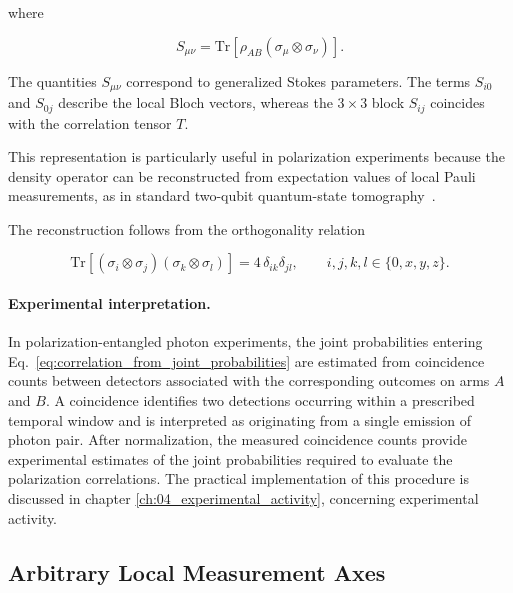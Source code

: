 where

\begin{equation}
S_{\mu\nu}
=
\mathrm{Tr}
\left[
\rho_{AB}
\left(
\sigma_\mu\otimes\sigma_\nu
\right)
\right].
\label{eq:generalized_stokes_parameters}
\end{equation}

The quantities \(S_{\mu\nu}\) correspond to generalized Stokes parameters.
The terms \(S_{i0}\) and \(S_{0j}\) describe the local Bloch vectors, whereas
the \(3\times3\) block \(S_{ij}\) coincides with the correlation tensor \(T\).

This representation is particularly useful in polarization experiments because
the density operator can be reconstructed from expectation values of local Pauli
measurements, as in standard two-qubit quantum-state tomography~\cite{altepeter_james_kwiat_quantum_state_tomography}.

The reconstruction follows from the orthogonality relation

\begin{equation}
\mathrm{Tr}
\left[
(\sigma_i\otimes\sigma_j)
(\sigma_k\otimes\sigma_l)
\right]
=
4\,\delta_{ik}\delta_{jl},
\qquad
i,j,k,l\in\{0,x,y,z\}.
\label{eq:pauli_tensor_orthogonality}
\end{equation}

\medskip 

\paragraph{Experimental interpretation.}
In polarization-entangled photon experiments, the joint probabilities entering
Eq.~\eqref{eq:correlation_from_joint_probabilities} are estimated from coincidence
counts between detectors associated with the corresponding outcomes on arms \(A\)
and \(B\). A coincidence identifies two detections occurring within a prescribed
temporal window and is interpreted as originating from a single emission of photon pair.
After normalization, the measured coincidence counts provide experimental
estimates of the joint probabilities required to evaluate the polarization
correlations. The practical implementation of this procedure is discussed in 
chapter \ref{ch:04_experimental_activity}, concerning experimental activity.


\subsection{Arbitrary Local Measurement Axes}
\label{subsec:arbitrary_measurement_axes}

